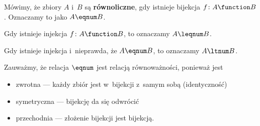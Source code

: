 \begin{definition}
	Mówimy, że zbiory \(A\) i~\(B\) są \textbf{równoliczne}, gdy istnieje bijekcja \(f\colon A \function B\). Oznaczamy to jako \(A \eqnum B\).

	Gdy istnieje injekcja \(f\colon A \function B\), to oznaczamy \(A \leqnum B\).

	Gdy istnieje injekcja i~nieprawda, że \(A \eqnum B\), to oznaczamy \(A \ltnum B\).
\end{definition}
Zauważmy, że relacja \({\eqnum}\) jest relacją równoważności, ponieważ jest
\begin{itemize}
	\item zwrotna --- każdy zbiór jest w~bijekcji z~samym sobą (identyczność)
	\item symetryczna --- bijekcję da się odwrócić
	\item przechodnia --- złożenie bijekcji jest bijekcją.
\end{itemize}
